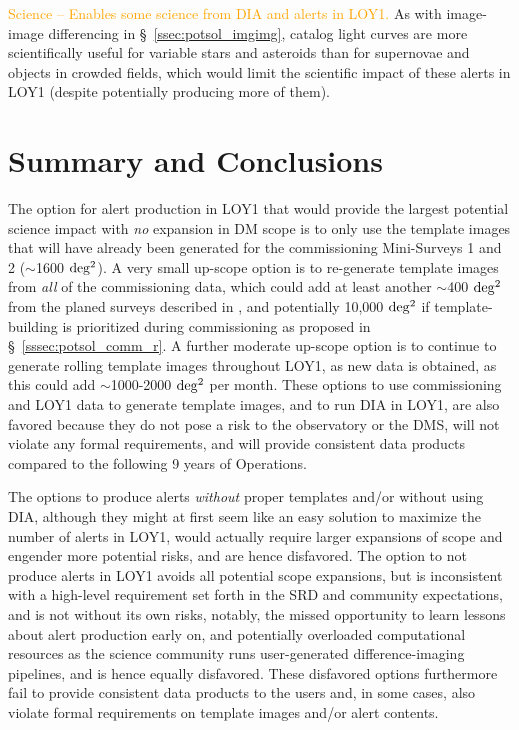 \documentclass[DM,lsstdraft,toc]{lsstdoc}
\begin{document}
\textcolor{orange}{Science -- Enables some science from DIA and alerts in LOY1.}
As with image-image differencing in \S~\ref{ssec:potsol_imgimg}, catalog light curves are more scientifically useful for variable stars and asteroids than for supernovae and objects in crowded fields, which would limit the scientific impact of these alerts in LOY1 (despite potentially producing more of them).


\clearpage
\section{Summary and Conclusions}\label{sec:rec}

The option for alert production in LOY1 that would provide the largest potential science impact with {\em no} expansion in DM scope is to only use the template images that will have already been generated for the commissioning Mini-Surveys 1 and 2 ($\sim$1600 $\rm deg^2$).
A very small up-scope option is to re-generate template images from {\em all} of the commissioning data, which could add at least another $\sim$400 $\rm deg^2$ from the planed surveys described in , and potentially 10,000 $\rm deg^2$ if template-building is prioritized during commissioning as proposed in \S~\ref{sssec:potsol_comm_r}.
A further moderate up-scope option is to continue to generate rolling template images throughout LOY1, as new data is obtained, as this could add $\sim$1000-2000 $\rm deg^2$ per month.
These options to use commissioning and LOY1 data to generate template images, and to run DIA in LOY1, are also favored because they do not pose a risk to the observatory or the DMS, will not violate any formal requirements, and will provide consistent data products compared to the following 9 years of Operations. 

The options to produce alerts {\it without} proper templates and/or without using DIA, although they might at first seem like an easy solution to maximize the number of alerts in LOY1, would actually require larger expansions of scope and engender more potential risks, and are hence disfavored.
The  option to not produce alerts in LOY1 avoids all potential scope expansions, but is inconsistent with a high-level requirement set forth in the SRD and community expectations, and is not without its own risks, notably,  the missed opportunity to learn lessons about alert production early on, and potentially overloaded computational resources as the science community runs user-generated difference-imaging pipelines, and is hence equally disfavored. 
These disfavored options furthermore fail to provide consistent data products to the users and, in some cases, also violate formal requirements on template images and/or alert contents.
\end{document}
